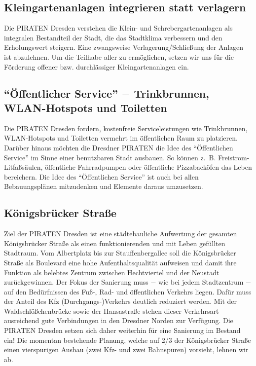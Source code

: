 \documentclass[a4paper, 11pt]{article}
\begin{document}
\subsection{Kleingartenanlagen integrieren statt verlagern}
Die PIRATEN Dresden verstehen die Klein- und Schrebergartenanlagen als integralen Bestandteil der Stadt, die das Stadtklima verbessern und den Erholungswert steigern. Eine zwangsweise Verlagerung/Schließung der Anlagen ist abzulehnen. Um die Teilhabe aller zu ermöglichen, setzen wir uns für die Förderung offener bzw. durchlässiger Kleingartenanlagen ein.


\subsection{``Öffentlicher Service'' $-$ Trinkbrunnen, WLAN-Hotspots und Toiletten}
Die PIRATEN Dresden fordern, kostenfreie Serviceleistungen wie Trinkbrunnen, WLAN-Hotspots und Toiletten vermehrt im öffentlichen Raum zu platzieren. Darüber hinaus möchten die Dresdner PIRATEN die Idee des ``Öffentlichen Service'' im Sinne einer benutzbaren Stadt ausbauen. So können z. B. Freistrom-Litfaßsäulen, öffentliche Fahrradpumpen oder öffentliche Pizzabacköfen das Leben bereichern. Die Idee des ``Öffentlichen Service'' ist auch bei allen Bebauungsplänen mitzudenken und Elemente daraus umzusetzen.


\subsection{Königsbrücker Straße}
Ziel der PIRATEN Dresden ist eine städtebauliche Aufwertung der gesamten Königsbrücker Straße als einen funktionierenden und mit Leben gefüllten Stadtraum. Vom Albertplatz bis zur Stauffenbergallee soll die Königsbrücker Straße als Boulevard eine hohe Aufenthaltsqualität aufweisen und damit ihre Funktion als belebtes Zentrum zwischen Hechtviertel und der Neustadt zurückgewinnen. Der Fokus der Sanierung muss $-$ wie bei jedem Stadtzentrum $-$ auf den Bedürfnissen des Fuß-, Rad- und öffentlichen Verkehrs liegen. Dafür muss der Anteil des Kfz (Durchgangs-)Verkehrs deutlich reduziert werden. Mit der Waldschlößchenbrücke sowie der Hansastraße stehen dieser Verkehrsart ausreichend gute Verbindungen in den Dresdner Norden zur Verfügung. Die PIRATEN Dresden setzen sich daher weiterhin für eine Sanierung im Bestand ein! Die momentan bestehende Planung, welche auf 2/3 der Königsbrücker Straße einen vierspurigen Ausbau (zwei Kfz- und zwei Bahnspuren) vorsieht, lehnen wir ab.
\end{document}

